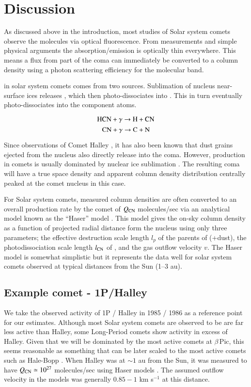 \documentclass{aa}
\newcommand{\kms}{km s$^{-1}$}
\newcommand{\bp}{$\beta$\,Pic}
\begin{document}
\section{Discussion}\label{sec:discuss}

As discussed above in the introduction, most studies of Solar system comets observe the  molecules via optical fluorescence. 
%
From measurements and simple physical arguments the  absorption/emission is optically thin everywhere.
%
This means a flux from part of the coma can immediately be converted to a column density using a photon scattering efficiency for the molecular band.

 in solar system comets comes from two sources.
%
Sublimation of nucleus near-surface ices releases , which then photo-dissociates into .
%
This in turn eventually photo-dissociates into the component atoms.

$$\ce{HCN} +\gamma \rightarrow \ce{H}+\ce{CN}$$
$$\ce{CN} + \gamma \rightarrow \ce{C}+\ce{N}$$

Since observations of Comet Halley \citep{AHearn1986}, it has also been known that dust grains ejected from the nucleus also directly release  into the coma.
%
However,  production in comets is usually dominated by nuclear ice sublimation \citep{Fray2005}.
%
The resulting  coma will have a true space density and apparent column density distribution centrally peaked at the comet nucleus in this case.

For Solar system comets, measured  column densities are often converted to an overall production rate by the comet of $Q_{\ce{CN}}$ molecules/sec via an analytical model known as the ``Haser'' model \citep{Haser2020}.
%
This model gives the on-sky column density as a function of projected radial distance form the nucleus using only three parameters; the effective destruction scale length $l_p$ of the parents of  (+dust), the photodissociation scale length $l_{\ce{CN}}$ of , and the gas outflow velocity $v$.
%
The Haser model is somewhat simplistic but it represents the data well for solar system comets observed at typical distances from the Sun (1--3 au).

\subsection{Example comet - 1P/Halley}

We take the observed activity of 1P / Halley in 1985 / 1986 as a reference point for our estimates.
%
Although most Solar system comets are observed to be are far less active than Halley, some Long-Period comets show activity in excess of Halley.
%
Given that we will be dominated by the most active comets at \bp{}, this seems reasonable as something that can be later scaled to the most active comets such as Hale-Bopp \citep{Schleicher2024}.
%
When Halley was at $\sim 1$ au from the Sun, it was measured to have $Q_{\ce{CN}}\simeq 10^{27}$ molecules/sec using Haser models \citep{AHearn1995}.
%
The assumed outflow velocity in the models was generally  $0.85 - 1$ \kms{} at this distance.
\end{document}

